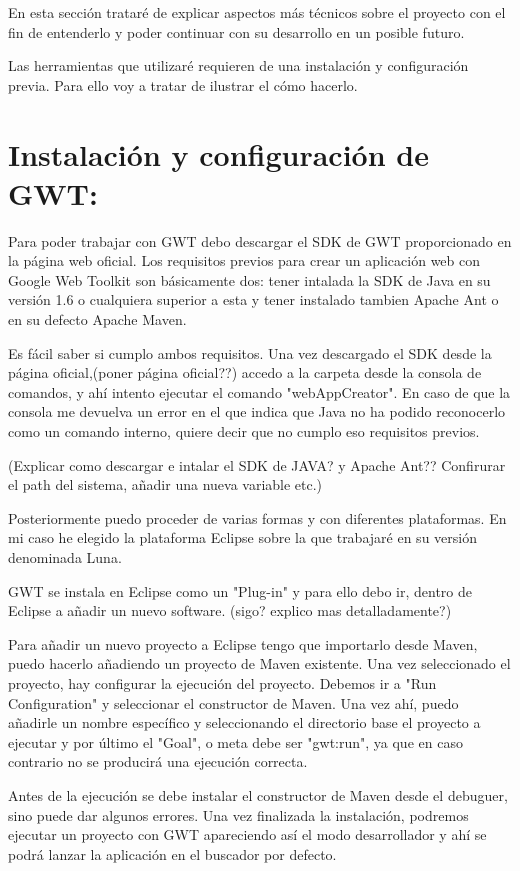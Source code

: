 
En esta sección trataré de explicar aspectos más técnicos sobre el proyecto con el fin de entenderlo y poder continuar con su desarrollo en un posible futuro.

Las herramientas que utilizaré requieren de una instalación y configuración 
previa. Para ello voy a  tratar de ilustrar el cómo hacerlo.

\section{Instalación y configuración de GWT:}

Para poder trabajar con GWT debo descargar el SDK de GWT proporcionado en la página web oficial. Los requisitos previos para crear un aplicación web con Google Web Toolkit son básicamente dos: tener intalada la SDK de Java en su versión 1.6 o cualquiera superior a esta y tener instalado tambien Apache Ant o en su defecto Apache Maven.

Es fácil saber si cumplo ambos requisitos. Una vez descargado el SDK desde la página oficial,(poner página oficial??) accedo a la carpeta desde la consola de comandos, y ahí intento ejecutar el comando "webAppCreator". En caso de que la consola me devuelva un error en el que indica que Java no ha podido reconocerlo como un comando interno, quiere decir que no cumplo eso requisitos previos.

(Explicar como descargar e intalar el SDK de JAVA? y Apache Ant?? Confirurar el path del sistema, añadir una nueva variable etc.)

Posteriormente puedo proceder de varias formas y con diferentes plataformas. En mi caso he elegido la plataforma Eclipse sobre la que trabajaré en  su versión denominada Luna. 

GWT se instala en Eclipse como un "Plug-in" y para ello debo ir, dentro de Eclipse a añadir un nuevo software. (sigo? explico mas detalladamente?)

Para añadir un nuevo proyecto a Eclipse tengo que importarlo desde Maven, puedo hacerlo añadiendo un proyecto de Maven existente. Una vez seleccionado el proyecto, hay configurar la ejecución del proyecto. Debemos ir a "Run Configuration" y seleccionar el constructor de Maven. Una vez ahí, puedo añadirle un nombre específico y seleccionando el directorio base el proyecto a ejecutar y por último el "Goal", o meta debe ser "gwt:run", ya que en caso contrario no se producirá una ejecución correcta.

Antes de la ejecución se debe instalar el constructor de Maven desde el debuguer, sino puede dar algunos errores. Una vez finalizada la instalación, podremos ejecutar un proyecto con GWT apareciendo así el modo desarrollador y ahí se podrá lanzar la aplicación en el buscador por defecto.